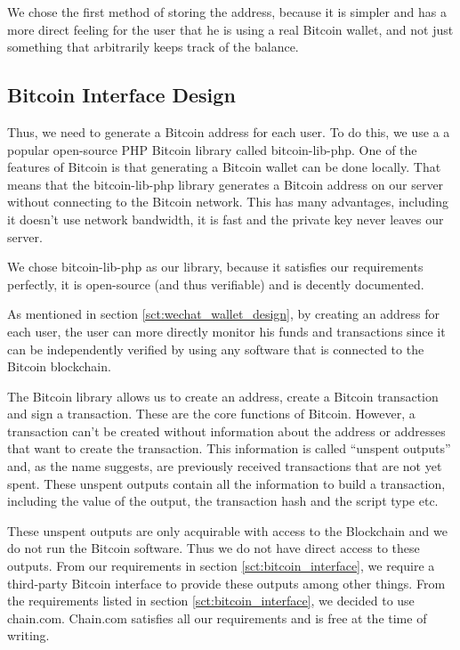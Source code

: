 We chose the first method of storing the address, because it is simpler and has a more direct feeling for the user that he is using a real Bitcoin wallet, and not just something that arbitrarily keeps track of the balance.

\subsection{Bitcoin Interface Design}
\label{sct:bitcoin_interface_design}

Thus, we need to generate a Bitcoin address for each user. To do this, we use a a popular open-source PHP Bitcoin library called bitcoin-lib-php. One of the features of Bitcoin is that generating a Bitcoin wallet can be done locally. That means that the bitcoin-lib-php library generates a Bitcoin address on our server without connecting to the Bitcoin network. This has many advantages, including it doesn't use network bandwidth, it is fast and the private key never leaves our server.

We chose bitcoin-lib-php as our library, because it satisfies our requirements perfectly, it is open-source (and thus verifiable) and is decently documented. 

As mentioned in section \ref{sct:wechat_wallet_design}, by creating an address for each user, the user can more directly monitor his funds and transactions since it can be independently verified by using any software that is connected to the Bitcoin blockchain.

The Bitcoin library allows us to create an address, create a Bitcoin transaction and sign a transaction. These are the core functions of Bitcoin. However, a transaction can't be created without information about the address or addresses that want to create the transaction. This information is called ``unspent outputs'' and, as the name suggests, are previously received transactions that are not yet spent. These unspent outputs contain all the information to build a transaction, including the value of the output, the transaction hash and the script type etc.

These unspent outputs are only acquirable with access to the Blockchain and we do not run the Bitcoin software. Thus we do not have direct access to these outputs. From our requirements in section \ref{sct:bitcoin_interface}, we require a third-party Bitcoin interface to provide these outputs among other things. From the requirements listed in section \ref{sct:bitcoin_interface}, we decided to use chain.com. Chain.com satisfies all our requirements and is free at the time of writing. 


